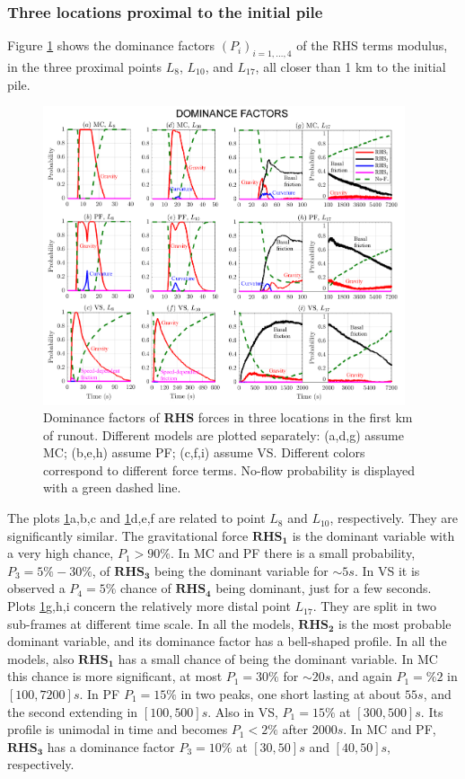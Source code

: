 \documentclass{article}
\begin{document}
\subsubsection{Three locations proximal to the initial pile}
Figure \ref{fig:Colima-Pr1} shows the dominance factors $(P_i)_{i=1,\dots,4}$ of the RHS terms modulus, in the three proximal points $L_{8}$, $L_{10}$, and $L_{17}$, all closer than 1 km to the initial pile.
\begin{figure}[H]
         \centering
        \includegraphics[width=0.95\textwidth]{figures/Colima/Pr1_total.png}
        \caption{Dominance factors of \textbf{RHS} forces in three locations in the first km of runout. Different models are plotted separately: (a,d,g) assume MC; (b,e,h) assume PF; (c,f,i) assume VS. Different colors correspond to different force terms. No-flow probability is displayed with a green dashed line.}
        \label{fig:Colima-Pr1}
\end{figure}
The plots \ref{fig:Colima-Pr1}a,b,c and \ref{fig:Colima-Pr1}d,e,f are related to point $L_8$ and $L_{10}$, respectively. They are significantly similar. The gravitational force $\boldsymbol{RHS_1}$ is the dominant variable with a very high chance, $P_1>90\%$. In MC and PF there is a small probability, $P_3=5\%-30\%$, of $\boldsymbol{RHS_3}$ being the dominant variable for $\sim 5 s$. In VS it is observed a $P_4=5\%$ chance of $\boldsymbol{RHS_4}$ being dominant, just for a few seconds. Plots \ref{fig:Colima-Pr1}g,h,i concern the relatively more distal point $L_{17}$. They are split in two sub-frames at different time scale. In all the models, $\boldsymbol{RHS_2}$ is the most probable dominant variable, and its dominance factor has a bell-shaped profile. In all the models, also $\boldsymbol{RHS_1}$ has a small chance of being the dominant variable. In MC this chance is more significant, at most $P_1=30\%$ for $\sim 20 s$, and again $P_1=\%2$ in $[100, 7200] s$. In PF $P_1=15\%$ in two peaks, one short lasting at about $55 s$, and the second extending in $[100,500] s$. Also in VS, $P_1=15\%$ at $[300, 500] s$. Its profile is unimodal in time and becomes $P_1<2\%$ after $2000 s$. In MC and PF, $\boldsymbol{RHS_3}$ has a dominance factor $P_3=10\%$ at $[30, 50] s$ and $[40, 50] s$, respectively.
\end{document}
